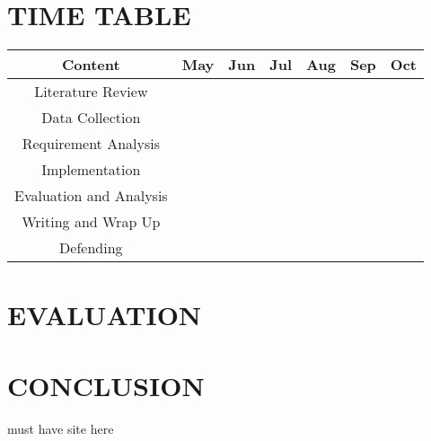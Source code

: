 \section{TIME TABLE}
\begin{center}
\begin{tabular}{ |c|p{1cm}|p{1cm}|p{1cm}|p{1cm}|p{1cm}|p{1cm}| }
 \hline
  Content                 & May              & Jun             & Jul              & Aug             & Sep             & Oct  \\ \hline
  Literature Review       & \cellcolor{red}  & \cellcolor{red} &                  &                 &                 &      \\ \hline
  Data Collection         &                  & \cellcolor{red} & \cellcolor{red}  &                 &                 &      \\ \hline
  Requirement Analysis    &                  &                 & \cellcolor{red}  &                 &                 &      \\ \hline
  Implementation          &                  &                 &                  & \cellcolor{red} &                 &      \\ \hline
  Evaluation and Analysis &                  &                 &                  &                 & \cellcolor{red} &   \\ \hline
  Writing and Wrap Up     &                  &                 &                  &      & \cellcolor{red} & \cellcolor{red}     \\ \hline
  Defending               &                  &                 &                  &                 &     &  \cellcolor{red}    \\ \hline


 \hline
\end{tabular}
\end{center}

 


\section{EVALUATION}

\section{CONCLUSION}

must have site here ~\cite{Hammond02}
